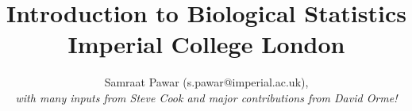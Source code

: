 \documentclass[11pt,a4paper]{book}
\begin{document}
	
\title{Introduction to Biological Statistics \\
 \vspace{24pt} 
 \large Imperial College London}
\author{Samraat Pawar (s.pawar@imperial.ac.uk), 
\\
{\it with many inputs from Steve Cook and major contributions from David Orme!}
  }

\maketitle


\tableofcontents

\mainmatter%
\setcounter{chapter}{-1}






\end{document}

